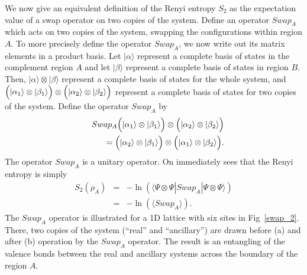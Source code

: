\documentclass[prl,aps,twocolumn,floatfix,amsmath,amssymb,superscriptaddress,tightenlines]{revtex4}
\begin{document}
We now give an equivalent definition of
the Renyi entropy $S_2$ as the expectation
value of a swap operator on two copies of the system.  
Define an
operator $Swap_A$ which acts on two copies of the system, swapping the
configurations within region $A$.  To more precisely define the operator
$Swap_A$, we now write out its matrix elements in a product basis.
Let $|\alpha\rangle$  represent a complete basis of states in the complement region
$A$ and let $|\beta\rangle$ represent a complete basis of states in
region $B$.  Then, $|\alpha\rangle \otimes |\beta\rangle$ represent
a complete basis of states for the whole system, and
$\Bigl( |\alpha_1\rangle \otimes |\beta_1\rangle \Bigr) \otimes
\Bigl( |\alpha_2\rangle \otimes |\beta_2\rangle \Bigr)$
represent a complete basis of states for two copies of the system.
Define the operator $Swap_A$ by
\begin{eqnarray}
&& Swap_A \Bigl( |\alpha_1\rangle \otimes |\beta_1\rangle \Bigr) \otimes
\Bigl( |\alpha_2\rangle \otimes |\beta_2\rangle \Bigr) \nonumber \\ &&=
\Bigl( |\alpha_2\rangle \otimes |\beta_1\rangle \Bigr) \otimes
\Bigl( |\alpha_1\rangle \otimes |\beta_2\rangle \Bigr).
\end{eqnarray}
The operator $Swap_A$ is a unitary operator.
On immediately sees that the Renyi entropy is simply
\begin{eqnarray}
\label{H2fromSwap}
S_2(\rho_A) &=&-\ln(\langle \Psi\otimes \Psi|Swap_A|\Psi\otimes \Psi\rangle) \\
&=&-\ln(\langle Swap_A \rangle).
\end{eqnarray}
The $Swap_A$ operator is illustrated for a 1D lattice with six sites in Fig~\ref{swap_2}.  There, two copies of the system (``real'' and ``ancillary'') are
drawn before (a) and after (b) operation by the $Swap_A$ operator.  The result is an entangling of the valence bonds between the 
real and ancillary systems across the boundary of the region $A$.
\end{document}
